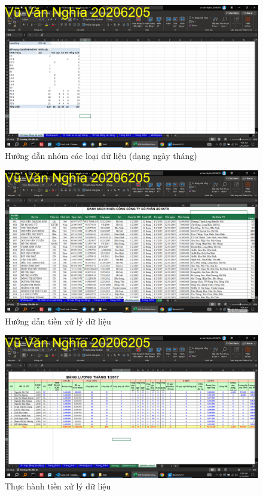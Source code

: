 \documentclass{article}
\begin{document}
\begin{figure}[H]
\centering
\includegraphics[scale = 0.15]{Bai1/HuongDan/8.png}
\caption{Hướng dẫn nhóm các loại dữ liệu (dạng ngày tháng)}
\end{figure}

\begin{figure}[H]
\centering
\includegraphics[scale = 0.15]{Bai1/HuongDan/9.png}
\caption{Hướng dẫn tiền xử lý dữ liệu}
\end{figure}

\begin{figure}[H]
\centering
\includegraphics[scale = 0.15]{Bai1/ThucHanh/0.png}
\caption{Thực hành tiền xử lý dữ liệu}
\end{figure}
\end{document}

